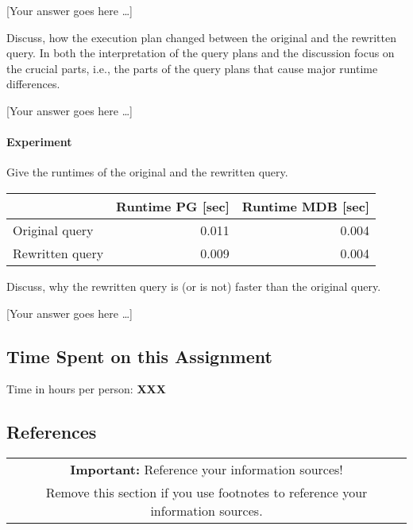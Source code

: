 \documentclass[11pt]{scrartcl}
\newcommand{\youranswerhere}{[Your answer goes here \ldots]}
\begin{document}
    \youranswerhere{}

    Discuss, how the execution plan changed between the original and the rewritten query. In both the interpretation of the query plans and the discussion focus on the crucial parts, i.e., the parts of the query plans that cause major runtime differences.

    \youranswerhere{}

    \paragraph{Experiment}

    Give the runtimes of the original and the rewritten query.

    \begin{table}[H]
        \centering
        \begin{tabular}{l|r|r}
            & Runtime PG [sec] & Runtime MDB [sec] \tabularnewline
            \hline
            Original query & 0.011 & 0.004 \tabularnewline
            Rewritten query & 0.009 & 0.004 \tabularnewline
        \end{tabular}
    \end{table}

    Discuss, why the rewritten query is (or is not) faster than the original query.

    \youranswerhere{}

    \subsection*{Time Spent on this Assignment}

    Time in hours per person: \textbf{XXX}

    \subsection*{References}

    \begin{table}[H]
        \centering
        \begin{tabular}{c}
            \hline
            \textbf{Important:} Reference your information sources! \tabularnewline
            Remove this section if you use footnotes to reference your information sources. \tabularnewline
            \hline
        \end{tabular}
    \end{table}
\end{document}
